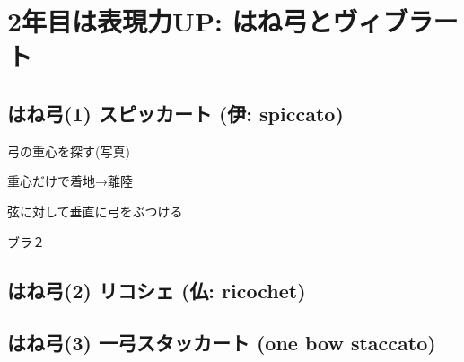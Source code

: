 \section{2年目は表現力UP: はね弓とヴィブラート}
\subsection{はね弓(1) スピッカート (伊: spiccato)}

弓の重心を探す(写真)

重心だけで着地→離陸

弦に対して垂直に弓をぶつける

ブラ２




\subsection{はね弓(2) リコシェ (仏: ricochet)}




\subsection{はね弓(3) 一弓スタッカート (one bow staccato)}

